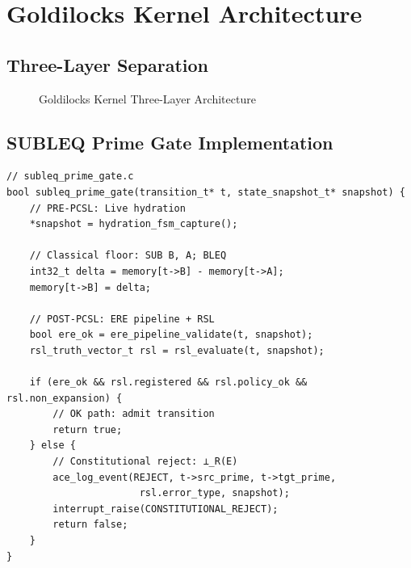 \documentclass[11pt,a4paper]{article}
\begin{document}
\section{Goldilocks Kernel Architecture}

\subsection{Three-Layer Separation}

\begin{figure}[h]
\centering
{}
\caption{Goldilocks Kernel Three-Layer Architecture}
\label{fig:kernel_arch}
\end{figure}

\subsection{SUBLEQ Prime Gate Implementation}

\begin{lstlisting}[caption={SUBLEQ Prime Gate with PCSL}, label=lst:subleq]
// subleq_prime_gate.c
bool subleq_prime_gate(transition_t* t, state_snapshot_t* snapshot) {
    // PRE-PCSL: Live hydration
    *snapshot = hydration_fsm_capture();
    
    // Classical floor: SUB B, A; BLEQ
    int32_t delta = memory[t->B] - memory[t->A];
    memory[t->B] = delta;
    
    // POST-PCSL: ERE pipeline + RSL
    bool ere_ok = ere_pipeline_validate(t, snapshot);
    rsl_truth_vector_t rsl = rsl_evaluate(t, snapshot);
    
    if (ere_ok && rsl.registered && rsl.policy_ok && rsl.non_expansion) {
        // OK path: admit transition
        return true;
    } else {
        // Constitutional reject: ⊥_R(E)
        ace_log_event(REJECT, t->src_prime, t->tgt_prime, 
                       rsl.error_type, snapshot);
        interrupt_raise(CONSTITUTIONAL_REJECT);
        return false;
    }
}
\end{lstlisting}
\end{document}
